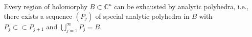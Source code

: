 Every region of holomorphy $B \subset \mathbb{C}^n$ can be exhausted by analytic polyhedra, i.e., there exists a sequence $(P_j)$ of special analytic polyhedra in $B$ with $P_j \subset \subset P_{j+1}$ and $\bigcup_{j=1}^{\infty} P_j = B$.
